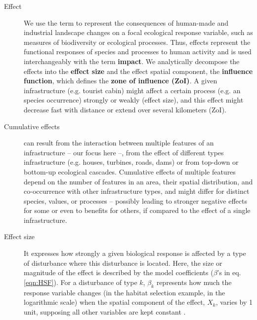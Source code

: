 \documentclass[titlepage]{article}
\begin{document}
\begin{tcolorbox}[width=1.3\textwidth,center,colback=yellow!5,colframe=yellow!75!black,title={Box 1 -- Definitions}]

\begin{description}

    \item[Effect] We use the term to represent the consequences of human-made and industrial landscape changes on a focal ecological response variable, such as measures of biodiversity or ecological processes. Thus, effects represent the functional responses of species and processes to human activity and is used interchangeably with the term \textbf{impact}. We analytically decompose the effects into the \textbf{effect size} and the effect spatial component, the \textbf{influence function}, which defines the \textbf{zone of influence (ZoI)}. A given infrastructure (e.g. tourist cabin) might affect a certain process (e.g. an species occurrence) strongly or weakly (effect size), and this effect might decrease fast with distance or extend over several kilometers (ZoI).
    
    \item[Cumulative effects] can result from the interaction between multiple features of an infrastructure -- our focus here --, from the effect of different types infrastructure (e.g. houses, turbines, roads, dams) or from top-down or bottom-up ecological cascades. Cumulative effects of multiple features depend on the number of features in an area, their spatial distribution, and co-occurrence with other infrastructure types, and might differ for distinct species, values, or processes -- possibly leading to stronger negative effects for some or even to benefits for others, if compared to the effect of a single infrastructure.
    
    \item[Effect size] It expresses how strongly a given biological response is affected by a type of disturbance where this disturbance is located. Here, the size or magnitude of the effect is described by the model coefficients ($\beta$'s in eq. \ref{eqn:HSF}). For a disturbance of type $k$, $\beta_k$ represents how much the response variable changes (in the habitat selection example, in the logarithmic scale) when the spatial component of the effect, $X_k$, varies by 1 unit, supposing all other variables are kept constant \citep{fieberg_how_2021}.
    

\end{description}
\end{tcolorbox}
\end{document}

